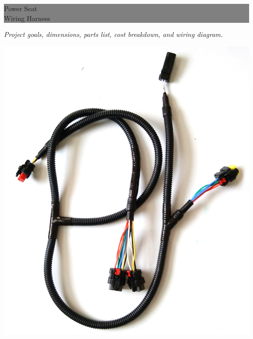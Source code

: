 \documentclass[12pt,letterpaper]{article}
\begin{document}
\newcommand{\getx}[1] {\StrBetween{#1}{(}{,}}
\newcommand{\gety}[1] {\StrBetween{#1}{,}{)}}
\def\mydef#1#2{\def#1{#2}}
\def\uncoord#1#2#3{\def#2{\getx{#1}}\def#3{\gety{#1}}}

\newcommand{\busline}[2] {\draw[thick] #1--#2;}


\begin{titlepage} %
	
	
	\colorbox{grey}{
		\parbox[t]{0.93\textwidth}{ %
			\parbox[t]{0.91\textwidth}{ %
				\raggedleft %
				\fontsize{50pt}{50pt}\selectfont %
				\vspace{0.6cm} %
				
				Power Seat \\ 
				Wiring Harness\\
				\vspace{0.6cm} %
			}
		}
	}

	\parbox[t]{0.93\textwidth}{
		\raggedleft
	    \vspace{0.7cm}
		\textit{Project goals, dimensions, parts list, cost breakdown, and wiring diagram.}
	}
	\center
    \includegraphics[width=0.80\linewidth]{1122171514.jpg}


\end{titlepage}
\end{document}
